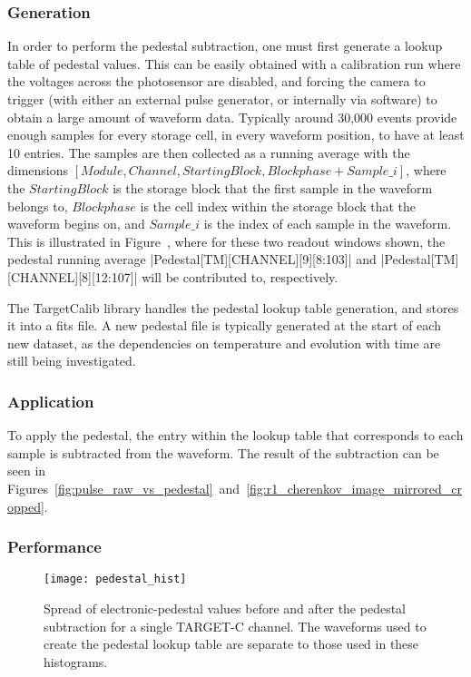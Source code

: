 \subsubsection{Generation}

In order to perform the pedestal subtraction, one must first generate a lookup table of pedestal values. This can be easily obtained with a calibration run where the voltages across the photosensor are disabled, and forcing the camera to trigger (with either an external pulse generator, or internally via software) to obtain a large amount of waveform data. Typically around 30,000 events provide enough samples for every storage cell, in every waveform position, to have at least 10 entries. The samples are then collected as a running average with the dimensions $[Module, Channel, Starting Block, Blockphase+Sample\_i]$, where the $Starting Block$ is the storage block that the first sample in the waveform belongs to, $Blockphase$ is the cell index within the storage block that the waveform begins on, and $Sample\_i$ is the index of each sample in the waveform. This is illustrated in Figure~, where for these two readout windows shown, the pedestal running average |Pedestal[TM][CHANNEL][9][8:103]| and |Pedestal[TM][CHANNEL][8][12:107]| will be contributed to, respectively.

The TargetCalib library handles the pedestal lookup table generation, and stores it into a \gls{fits} file. A new pedestal file is typically generated at the start of each new dataset, as the dependencies on temperature and evolution with time are still being investigated.

\subsubsection{Application}

To apply the pedestal, the entry within the lookup table that corresponds to each sample is subtracted from the waveform. The result of the subtraction can be seen in Figures~\ref{fig:pulse_raw_vs_pedestal}~and~\ref{fig:r1_cherenkov_image_mirrored_cropped}. 

\subsubsection{Performance}

\begin{figure}
	\centering
    \texttt{[image: pedestal\_hist]} 
	\caption[Spread of electronic-pedestal values before and after the pedestal subtraction.]{Spread of electronic-pedestal values before and after the pedestal subtraction for a single TARGET-C channel. The waveforms used to create the pedestal lookup table are separate to those used in these histograms.} 
	\label{fig:pedestalresiduals}
\end{figure}

